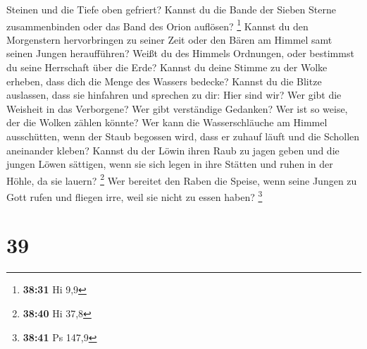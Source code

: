 Steinen und die Tiefe oben gefriert?  Kannst du die Bande
der Sieben Sterne zusammenbinden oder das Band des Orion auflösen?
\footnote{\textbf{38:31} Hi 9,9}  Kannst du den
Morgenstern hervorbringen zu seiner Zeit oder den Bären am Himmel samt
seinen Jungen heraufführen?  Weißt du des Himmels
Ordnungen, oder bestimmst du seine Herrschaft über die Erde?
 Kannst du deine Stimme zu der Wolke erheben, dass dich
die Menge des Wassers bedecke?  Kannst du die Blitze
auslassen, dass sie hinfahren und sprechen zu dir: Hier sind wir?
 Wer gibt die Weisheit in das Verborgene? Wer gibt
verständige Gedanken?  Wer ist so weise, der die Wolken
zählen könnte? Wer kann die Wasserschläuche am Himmel ausschütten,
 wenn der Staub begossen wird, dass er zuhauf läuft und
die Schollen aneinander kleben?  Kannst du der Löwin
ihren Raub zu jagen geben und die jungen Löwen sättigen, 
wenn sie sich legen in ihre Stätten und ruhen in der Höhle, da sie
lauern? \footnote{\textbf{38:40} Hi 37,8}  Wer bereitet
den Raben die Speise, wenn seine Jungen zu Gott rufen und fliegen irre,
weil sie nicht zu essen haben? \footnote{\textbf{38:41} Ps 147,9}

\hypertarget{section-38}{%
\section{39}\label{section-38}}

